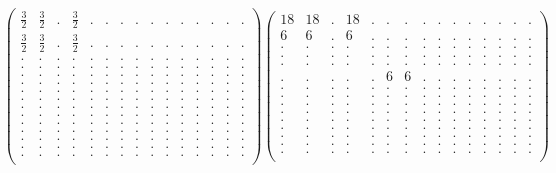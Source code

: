 \documentclass[12pt,a4paper]{amsart}
\begin{document}
\begin{align*}
\left(\begin{array}{rrrrrrrrrrrrrrr}%
\frac32&\frac32&.&\frac32&.&.&.&.&.&.&.&.&.&.&.\\%
\frac32&\frac32&.&\frac32&.&.&.&.&.&.&.&.&.&.&.\\%
.&.&.&.&.&.&.&.&.&.&.&.&.&.&.\\%
.&.&.&.&.&.&.&.&.&.&.&.&.&.&.\\%
.&.&.&.&.&.&.&.&.&.&.&.&.&.&.\\%
.&.&.&.&.&.&.&.&.&.&.&.&.&.&.\\%
.&.&.&.&.&.&.&.&.&.&.&.&.&.&.\\%
.&.&.&.&.&.&.&.&.&.&.&.&.&.&.\\%
.&.&.&.&.&.&.&.&.&.&.&.&.&.&.\\%
.&.&.&.&.&.&.&.&.&.&.&.&.&.&.\\%
.&.&.&.&.&.&.&.&.&.&.&.&.&.&.\\%
.&.&.&.&.&.&.&.&.&.&.&.&.&.&.\\%
.&.&.&.&.&.&.&.&.&.&.&.&.&.&.\\%
.&.&.&.&.&.&.&.&.&.&.&.&.&.&.\\%
.&.&.&.&.&.&.&.&.&.&.&.&.&.&.\\%
\end{array}\right)%
\left(\begin{array}{rrrrr|rr|rrrr|rr|rr}%
18&18&.&18&.&.&.&.&.&.&.&.&.&.&.\\%
6&6&.&6&.&.&.&.&.&.&.&.&.&.&.\\%
.&.&.&.&.&.&.&.&.&.&.&.&.&.&.\\%
.&.&.&.&.&.&.&.&.&.&.&.&.&.&.\\%
.&.&.&.&.&.&.&.&.&.&.&.&.&.&.\\\hline%
.&.&.&.&.&6&6&.&.&.&.&.&.&.&.\\%
.&.&.&.&.&.&.&.&.&.&.&.&.&.&.\\\hline%
.&.&.&.&.&.&.&.&.&.&.&.&.&.&.\\%
.&.&.&.&.&.&.&.&.&.&.&.&.&.&.\\%
.&.&.&.&.&.&.&.&.&.&.&.&.&.&.\\%
.&.&.&.&.&.&.&.&.&.&.&.&.&.&.\\\hline%
.&.&.&.&.&.&.&.&.&.&.&.&.&.&.\\%
.&.&.&.&.&.&.&.&.&.&.&.&.&.&.\\\hline%
.&.&.&.&.&.&.&.&.&.&.&.&.&.&.\\%
.&.&.&.&.&.&.&.&.&.&.&.&.&.&.\\%
\end{array}\right)%
\end{align*}
\end{document}
